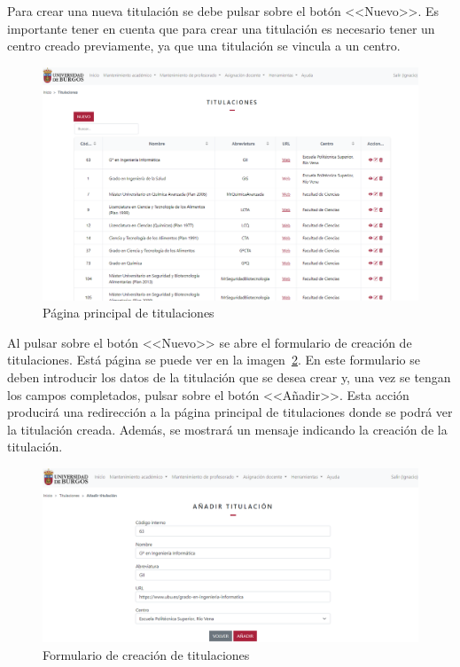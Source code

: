 Para crear una nueva titulación se debe pulsar sobre el botón <<Nuevo>>.
Es importante tener en cuenta que para crear una titulación es necesario tener un centro creado previamente, ya que una titulación se vincula a un centro.

\begin{figure}
	\centering
	\includegraphics[width=\textwidth]{../img/Anexos/Manual usuario/titulaciones.png}
	\caption{Página principal de titulaciones}\label{pag:titulaciones}
\end{figure}

Al pulsar sobre el botón <<Nuevo>> se abre el formulario de creación de titulaciones.
Está página se puede ver en la imagen~\ref{pag:formTitulacion}.
En este formulario se deben introducir los datos de la titulación que se desea crear y, una vez se tengan los campos completados, pulsar sobre el botón <<Añadir>>.
Esta acción producirá una redirección a la página principal de titulaciones donde se podrá ver la titulación creada.
Además, se mostrará un mensaje indicando la creación de la titulación.

\begin{figure}
	\centering
	\includegraphics[width=\textwidth]{../img/Anexos/Manual usuario/formTitulacion.png}
	\caption{Formulario de creación de titulaciones}\label{pag:formTitulacion}
\end{figure}

